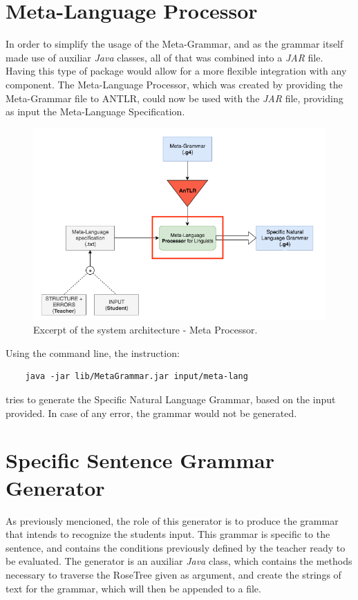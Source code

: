 \section{Meta-Language Processor}

In order to simplify the usage of the Meta-Grammar, and as the grammar itself made use of auxiliar \emph{Java} classes, all of that was combined into a \emph{JAR} file.
Having this type of package would allow for a more flexible integration with any component.
The Meta-Language Processor, which was created by providing the Meta-Grammar file to ANTLR, could now be used with the \emph{JAR} file, 
providing as input the Meta-Language Specification. 

\begin{figure}[h]
    \centering
    \includegraphics[width=12cm]{images/system_meta_processor.png}
    \caption{Excerpt of the system architecture - Meta Processor.}
    \label{fig:excerpt_system_architecture}
\end{figure}

\noindent Using the command line, the instruction:
\begin{Verbatim}
	java -jar lib/MetaGrammar.jar input/meta-lang
\end{Verbatim}
\noindent tries to generate the Specific Natural Language Grammar, based on the input provided. In case of any error, the grammar would not be generated.


\section{Specific Sentence Grammar Generator}

As previously mencioned, the role of this generator is to produce the grammar that intends to recognize the students input.
This grammar is specific to the sentence, and contains the conditions previously defined by the teacher ready to be evaluated.
The generator is an auxiliar \emph{Java} class, which contains the methods necessary to traverse the RoseTree given as argument,
and create the strings of text for the grammar, which will then be appended to a file.


